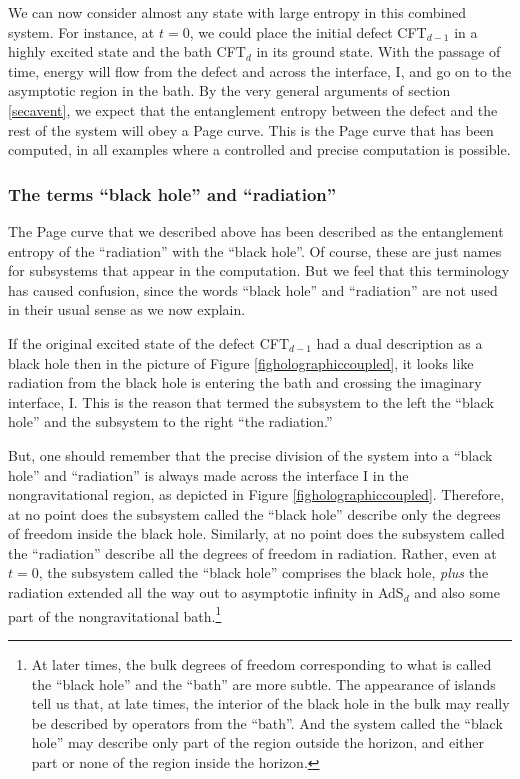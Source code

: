 \documentclass[12pt]{article}
\begin{document}
We can now consider almost any state with large entropy in this combined system. For instance, at $t = 0$,  we could place the initial defect CFT$_{d-1}$ in a highly excited state and the bath CFT$_d$ in its ground state. With the passage of time, energy will flow from the defect and across the interface, I, and go on to the asymptotic region in the bath. 
 By the very general arguments of section \ref{secavent}, we expect that the entanglement entropy between the defect and the rest of the system will obey a Page curve. This is the Page curve that has been computed, in all examples where a 
controlled and precise computation is possible.


\subsubsection{The terms ``black hole'' and ``radiation''}
The Page curve that we described above has been described as the entanglement entropy of the ``radiation'' with the ``black hole''. Of course, these are just names for subsystems that appear in the computation. But we feel that this terminology has caused confusion, since the words ``black hole'' and ``radiation'' are not used in their usual sense as we now explain.

If the original excited state of the defect CFT$_{d-1}$ had a dual description as a black hole then in the picture of Figure \ref{figholographiccoupled}, it looks like radiation from the black hole is entering the bath and crossing the imaginary interface, I. 
 This is the reason that \cite{Almheiri:2019hni,Almheiri:2019yqk} termed the subsystem to the left the ``black hole'' and the subsystem to the right ``the radiation.''   

But, one should remember that the precise division of the system into a ``black hole'' and ``radiation''  is always made across  the interface I in the nongravitational region, as depicted in Figure \ref{figholographiccoupled}. Therefore, at no point does the subsystem called the ``black hole'' describe only the degrees of freedom inside the black hole. Similarly, at no point does the subsystem called the ``radiation'' describe all the degrees of freedom in radiation.  Rather, even at $t = 0$, the subsystem called the ``black hole'' comprises the black hole,  {\em plus} the radiation extended all the way out to asymptotic infinity in AdS$_d$ and also some part of the nongravitational bath.\footnote{At later times, the bulk degrees of freedom corresponding to what is called the ``black hole'' and the ``bath'' are more subtle. The appearance of islands tell us that, at late times, the interior of the black hole in the bulk may really be described by operators from the ``bath''. And the system called the ``black hole'' may describe only part of the region outside the horizon, and either part or none of the region inside the horizon.}
\end{document}
